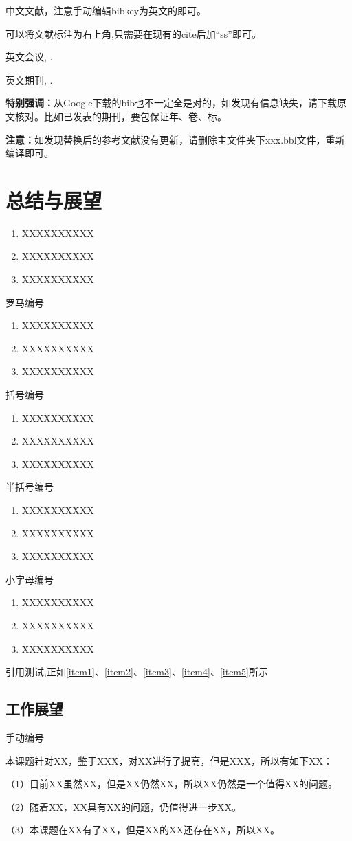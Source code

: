 中文文献\cite{zh-book-1}，注意手动编辑bibkey为英文的即可。

可以将文献标注为右上角,只需要在现有的cite后加“ss”即可。

英文会议\cite{Kraus2021Current}, \cite{WuYangLuEtAl2021}.

英文期刊\cite{LuoZengYuanEtAl2016}, \cite{Wu2022Boosting}.


\textbf{特别强调：}从Google下载的bib也不一定全是对的，如发现有信息缺失，请下载原文核对。比如已发表的期刊，要包保证年、卷、标。

\textbf{注意：}如发现替换后的参考文献没有更新，请删除主文件夹下xxx.bbl文件，重新编译即可。

\newpage


\section{总结与展望}

\begin{enumerate}
 \item XXXXXXXXXX
 \label{item1}
 \item XXXXXXXXXX
 \item XXXXXXXXXX
\end{enumerate}
罗马编号
\begin{enumerate}[label=(\roman*)]
 \item XXXXXXXXXX
 \label{item2}
 \item XXXXXXXXXX
 \item XXXXXXXXXX
\end{enumerate}
括号编号
\begin{enumerate}[label=(\arabic*)]
 \item XXXXXXXXXX
 \label{item3}
 \item XXXXXXXXXX
 \item XXXXXXXXXX
\end{enumerate}
半括号编号
\begin{enumerate}[label=\arabic*)]
 \item XXXXXXXXXX
 \label{item4}
 \item XXXXXXXXXX
 \item XXXXXXXXXX
\end{enumerate}
小字母编号
\begin{enumerate}[label=\alph*)]
 \item XXXXXXXXXX
 \label{item5}
 \item XXXXXXXXXX
 \item XXXXXXXXXX
\end{enumerate}

引用测试,正如\ref{item1}、\ref{item2}、\ref{item3}、\ref{item4}、\ref{item5}所示

\subsection{工作展望}
手动编号 %
\par
本课题针对XX，鉴于XXX，对XX进行了提高，但是XXX，所以有如下XX：

（1）目前XX虽然XX，但是XX仍然XX，所以XX仍然是一个值得XX的问题。

（2）随着XX，XX具有XX的问题，仍值得进一步XX。

（3）本课题在XX有了XX，但是XX的XX还存在XX，所以XX。


\newpage
